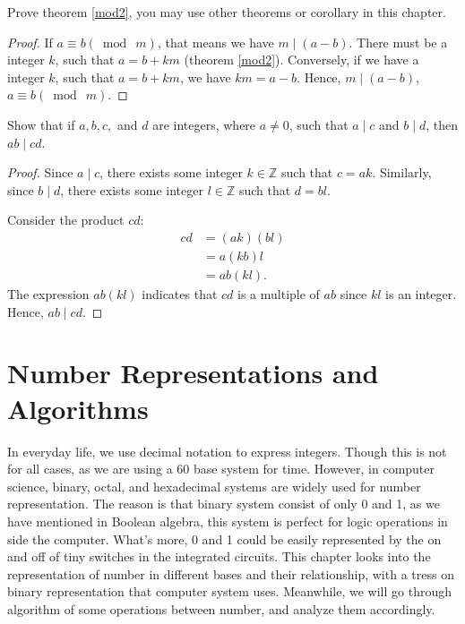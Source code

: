     \begin{exercise}
        Prove theorem \ref{mod2}, you may use other theorems or corollary in this chapter.
    \end{exercise}
    \begin{proof}
        If $a \equiv b (\bmod \ m)$, that means we have $m\mid(a-b)$. There must be a integer $k$, such that $a = b + km$ (theorem \ref{mod2}). Conversely, if we have a integer $k$, such that $a = b+km$, we have $km = a-b$. Hence, $m\mid(a-b)$, $a \equiv b (\bmod \ m)$.
    \end{proof}
    \begin{exercise}
        Show that if \( a, b, c, \) and \( d \) are integers, where \( a \neq 0 \), such that \( a \mid c \) and \( b \mid d \), then \( ab \mid cd \).
    \end{exercise}
    \begin{proof}
        Since \( a \mid c \), there exists some integer \( k \in \mathbb{Z} \) such that \( c = ak \). Similarly, since \( b \mid d \), there exists some integer \( l \in \mathbb{Z} \) such that \( d = bl \).

        Consider the product \( cd \):
        \begin{align*}
        cd &= (ak)(bl) \\
        &= a(kb)l \\
        &= ab(kl).
        \end{align*}
        The expression \( ab(kl) \) indicates that \( cd \) is a multiple of \( ab \) since \( kl \) is an integer. Hence, \( ab \mid cd \).
    \end{proof}
    





    \section{Number Representations and Algorithms}
    In everyday life, we use decimal notation to express integers. Though this is not
    for all cases, as we are using a 60 base system for time. However, in computer science, binary, octal, and hexadecimal
    systems are widely used for number representation. The reason is that binary system consist of 
    only 0 and 1, as we have mentioned in Boolean algebra, this system is perfect for logic operations
    in side the computer. What's more, 0 and 1 could be easily represented by the on and off of tiny
    switches in the integrated circuits. This chapter looks into the representation of number
    in different bases and their relationship, with a tress on binary representation that computer
    system uses. Meanwhile, we will go through algorithm of some operations between number, and
    analyze them accordingly.
